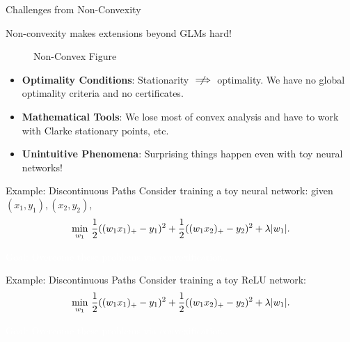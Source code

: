 \documentclass[usenames,dvipsnames,mathserif,notheorems]{beamer}
\newcommand{\bad}[1]{\textcolor{bad}{#1}}
\def\showtikz{}
\begin{document}
\begin{frame}{Challenges from Non-Convexity}
	\begin{center}
		\Large
		Non-convexity makes extensions beyond GLMs \bad{hard}!
	\end{center}

	\begin{figure}[]
		\centering
		\ifdefined\showtikz
			
		\else
			\Huge Non-Convex Figure
		\fi
	\end{figure}

	\pause
	\begin{itemize}
		\item \textbf{Optimality Conditions}: Stationarity \( \centernot \implies \) optimality.
		      We have no global optimality criteria and no certificates.

		      \vspace{1em}

		      \pause
		\item \textbf{Mathematical Tools}: We lose most of convex analysis
		      and have to work with Clarke stationary points, etc.
		      \vspace{1em}

		      \pause

		\item \textbf{Unintuitive Phenomena}: Surprising things happen even
		      with toy neural networks!

	\end{itemize}

\end{frame}

\begin{frame}{Example: Discontinuous Paths}
	Consider training a toy neural network: given \( (x_1, y_1), (x_2, y_2) \),
	\pause
	\[
		\min_{w_1} \, \frac 1 2 ((w_1 x_1)_+ - y_1)^2 + \frac 1 2 ((w_1 x_2)_+ - y_2)^2 + \lambda |w_1|.
	\]
	\pause

	\begin{center}
		
	\end{center}

	\begin{center}
		\Large
		\textcolor{white}{Goal: Overcome these problems via convexification..}
	\end{center}

\end{frame}

\begin{frame}{Example: Discontinuous Paths}
	Consider training a toy ReLU network:
	\[
		\min_{w_1} \, \frac 1 2 ((w_1 x_1)_+ - y_1)^2 + \frac 1 2 ((w_1 x_2)_+ - y_2)^2 + \lambda |w_1|.
	\]

	\begin{center}
		
	\end{center}

	\begin{center}
		\Large
		\textcolor{white}{Goal: Overcome these problems via convexification..}
	\end{center}

\end{frame}
\end{document}
